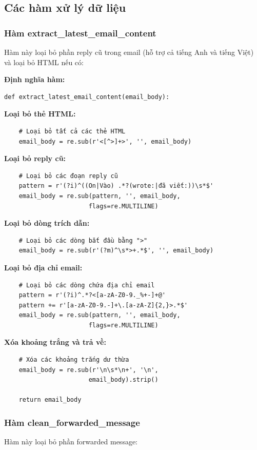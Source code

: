 \documentclass[../DoAn.tex]{subfiles}
\begin{document}
\subsection{Các hàm xử lý dữ liệu}

\subsubsection{Hàm extract\_latest\_email\_content}
Hàm này loại bỏ phần reply cũ trong email (hỗ trợ cả tiếng Anh và tiếng Việt) và loại bỏ HTML nếu có:

\textbf{Định nghĩa hàm:}
\begin{verbatim}
def extract_latest_email_content(email_body):
\end{verbatim}

\textbf{Loại bỏ thẻ HTML:}
\begin{verbatim}
    # Loại bỏ tất cả các thẻ HTML
    email_body = re.sub(r'<[^>]+>', '', email_body)
\end{verbatim}

\textbf{Loại bỏ reply cũ:}
\begin{verbatim}
    # Loại bỏ các đoạn reply cũ
    pattern = r'(?i)^((On|Vào) .*?(wrote:|đã viết:))\s*$'
    email_body = re.sub(pattern, '', email_body, 
                       flags=re.MULTILINE)
\end{verbatim}

\textbf{Loại bỏ dòng trích dẫn:}
\begin{verbatim}
    # Loại bỏ các dòng bắt đầu bằng ">"
    email_body = re.sub(r'(?m)^\s*>+.*$', '', email_body)
\end{verbatim}

\textbf{Loại bỏ địa chỉ email:}
\begin{verbatim}
    # Loại bỏ các dòng chứa địa chỉ email
    pattern = r'(?i)^.*?<[a-zA-Z0-9._%+-]+@'
    pattern += r'[a-zA-Z0-9.-]+\.[a-zA-Z]{2,}>.*$'
    email_body = re.sub(pattern, '', email_body, 
                       flags=re.MULTILINE)
\end{verbatim}

\textbf{Xóa khoảng trắng và trả về:}
\begin{verbatim}
    # Xóa các khoảng trắng dư thừa
    email_body = re.sub(r'\n\s*\n+', '\n', 
                       email_body).strip()
    
    return email_body
\end{verbatim}

\subsubsection{Hàm clean\_forwarded\_message}
Hàm này loại bỏ phần forwarded message:
\end{document}
